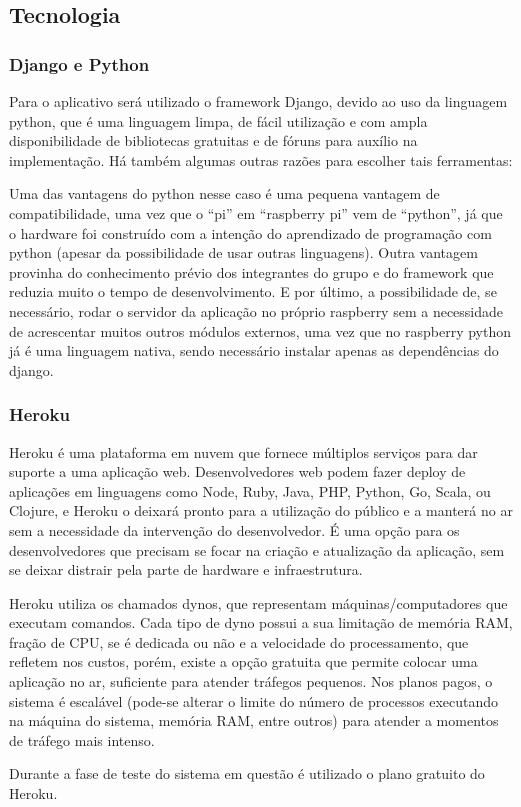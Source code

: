\subsection{Tecnologia}

\subsubsection{Django e Python}

Para o aplicativo será utilizado o framework Django, devido ao uso da linguagem python, que é uma linguagem limpa, de fácil utilização e com ampla disponibilidade de bibliotecas gratuitas e de fóruns para auxílio na implementação.
Há também algumas outras razões para escolher tais ferramentas:

Uma das vantagens do python nesse caso é uma pequena vantagem de compatibilidade, uma vez que o ``pi'' em ``raspberry pi'' vem de ``python'', já que o hardware foi construído com a intenção do aprendizado de programação com python \cite{raspberry_pi_site} (apesar da possibilidade de usar outras linguagens). Outra vantagem provinha do conhecimento prévio dos integrantes do grupo e do framework que reduzia muito o tempo de desenvolvimento. E por último, a possibilidade de, se necessário, rodar o servidor da aplicação no próprio raspberry sem a necessidade de acrescentar muitos outros módulos externos, uma vez que no raspberry python já é uma linguagem nativa, sendo necessário instalar apenas as dependências do django.

\subsubsection{Heroku}

Heroku é uma plataforma em nuvem que fornece múltiplos serviços para dar suporte a uma aplicação web. Desenvolvedores web podem fazer deploy de aplicações em linguagens como Node, Ruby, Java, PHP, Python, Go, Scala, ou Clojure, e Heroku o deixará pronto para a utilização do público e a manterá no ar sem a necessidade da intervenção do desenvolvedor. É uma opção para os desenvolvedores que precisam se focar na criação e atualização da aplicação, sem se deixar distrair pela parte de hardware e infraestrutura.  

Heroku utiliza os chamados dynos, que representam máquinas/computadores que executam comandos. Cada tipo de dyno possui a sua limitação de memória RAM, fração de CPU, se é dedicada ou não e a velocidade do processamento, que refletem nos custos, porém, existe a opção gratuita que permite colocar uma aplicação no ar, suficiente para atender tráfegos pequenos. Nos planos pagos, o sistema é escalável (pode-se alterar o limite do número de processos executando na máquina do sistema, memória RAM, entre outros) para atender a momentos de tráfego mais intenso.\cite{heroku}

Durante a fase de teste do sistema em questão é utilizado o plano gratuito do Heroku.